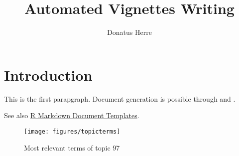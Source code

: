 \documentclass[fontsize=12pt,
               paper=a4,
               headings=small,
               headsepline=on,
               twoside=false,
               parskip=half,
               listof=ignorechapter,
               listof=entryprefix
               ]{scrreprt}
\title{Automated Vignettes Writing}
\subtitle{}
\author{Donatus Herre}
\begin{document}


\maketitle


\newpage
\begingroup
\clearpage
{}
\hypersetup{linkcolor=black}
\renewcommand*{\chapterpagestyle}{empty}
\setcounter{tocdepth}{2}
\tableofcontents
\endgroup


\newpage
{}
\renewcommand\thefigure{\arabic{figure}}
\renewcommand\thetable{\arabic{table}}
\renewcommand{\theequation}{\arabic{equation}}
\frenchspacing

\chapter{Introduction}\label{introduction}

This is the first parapgraph. Document generation is possible through
\textcite{Xie2016} and \textcite{Xie2019}.

See also
\href{https://rstudio.github.io/rstudio-extensions/rmarkdown_templates.html}{R
Markdown Document Templates}.

\pagebreak

\begin{figure}[H]
\texttt{[image: figures/topicterms]} \caption{\label{fig:topic97}Most relevant terms of topic 97}\label{fig:t-97}
\end{figure}

\nocite{*}

\pagebreak

\singlespacing

\printbibliography[title=Sources,heading=bibintoc]
\pagebreak
\end{document}

